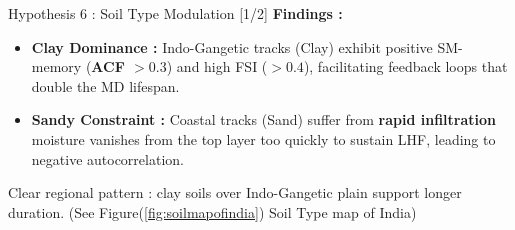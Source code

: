 \documentclass[8pt, aspectratio=169]{beamer}
\begin{document}
\begin{frame}{Hypothesis 6 : Soil Type Modulation [1/2]}
    \vspace{0.15cm}
    \footnotesize
    \textbf{Findings :}
    \begin{itemize} \tiny
        \item \textbf{Clay Dominance :} Indo-Gangetic tracks (Clay) exhibit positive SM-memory (\textbf{ACF $> 0.3$}) and high FSI (\textbf{$>0.4$}), facilitating feedback loops that double the MD lifespan.
        \item \textbf{Sandy Constraint :} Coastal tracks (Sand) suffer from \textbf{rapid infiltration} moisture vanishes from the top layer too quickly to sustain LHF, leading to negative autocorrelation.
    \end{itemize}

    Clear regional pattern : clay soils over Indo-Gangetic plain support longer duration. (See Figure(\ref{fig:soilmapofindia}) Soil Type map of India)
\end{frame}
\end{document}
